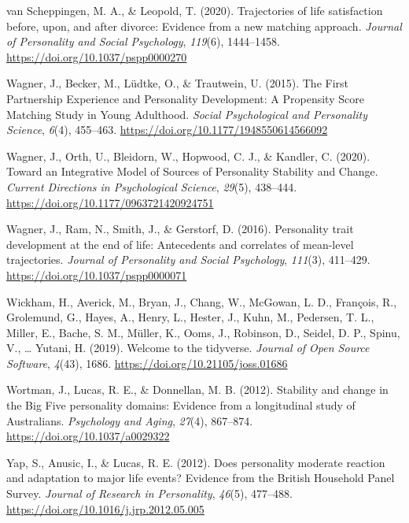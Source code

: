 \documentclass[
  english,
  man, noextraspace]{apa7}
\begin{document}
\leavevmode\hypertarget{ref-vanscheppingenTrajectoriesLifeSatisfaction2020}{}%
van Scheppingen, M. A., \& Leopold, T. (2020). Trajectories of life satisfaction before, upon, and after divorce: Evidence from a new matching approach. \emph{Journal of Personality and Social Psychology}, \emph{119}(6), 1444--1458. \url{https://doi.org/10.1037/pspp0000270}

\leavevmode\hypertarget{ref-wagnerFirstPartnershipExperience2015}{}%
Wagner, J., Becker, M., Lüdtke, O., \& Trautwein, U. (2015). The First Partnership Experience and Personality Development: A Propensity Score Matching Study in Young Adulthood. \emph{Social Psychological and Personality Science}, \emph{6}(4), 455--463. \url{https://doi.org/10.1177/1948550614566092}

\leavevmode\hypertarget{ref-wagnerIntegrativeModelSources2020}{}%
Wagner, J., Orth, U., Bleidorn, W., Hopwood, C. J., \& Kandler, C. (2020). Toward an Integrative Model of Sources of Personality Stability and Change. \emph{Current Directions in Psychological Science}, \emph{29}(5), 438--444. \url{https://doi.org/10.1177/0963721420924751}

\leavevmode\hypertarget{ref-wagnerPersonalityTraitDevelopment2016}{}%
Wagner, J., Ram, N., Smith, J., \& Gerstorf, D. (2016). Personality trait development at the end of life: Antecedents and correlates of mean-level trajectories. \emph{Journal of Personality and Social Psychology}, \emph{111}(3), 411--429. \url{https://doi.org/10.1037/pspp0000071}

\leavevmode\hypertarget{ref-tidyverse2019}{}%
Wickham, H., Averick, M., Bryan, J., Chang, W., McGowan, L. D., François, R., Grolemund, G., Hayes, A., Henry, L., Hester, J., Kuhn, M., Pedersen, T. L., Miller, E., Bache, S. M., Müller, K., Ooms, J., Robinson, D., Seidel, D. P., Spinu, V., \ldots{} Yutani, H. (2019). Welcome to the tidyverse. \emph{Journal of Open Source Software}, \emph{4}(43), 1686. \url{https://doi.org/10.21105/joss.01686}

\leavevmode\hypertarget{ref-wortmanStabilityChangeBig2012}{}%
Wortman, J., Lucas, R. E., \& Donnellan, M. B. (2012). Stability and change in the Big Five personality domains: Evidence from a longitudinal study of Australians. \emph{Psychology and Aging}, \emph{27}(4), 867--874. \url{https://doi.org/10.1037/a0029322}

\leavevmode\hypertarget{ref-yapDoesPersonalityModerate2012}{}%
Yap, S., Anusic, I., \& Lucas, R. E. (2012). Does personality moderate reaction and adaptation to major life events? Evidence from the British Household Panel Survey. \emph{Journal of Research in Personality}, \emph{46}(5), 477--488. \url{https://doi.org/10.1016/j.jrp.2012.05.005}

\endgroup
\end{document}
